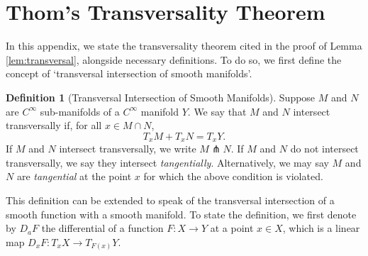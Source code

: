 \documentclass[11pt]{article}
\newcommand{\1}{\mathbf{1}}
\theoremstyle{definition}
\newtheorem{defn}{Definition}%
\theoremstyle{remark}
\begin{document}
\section{Thom's Transversality Theorem}\label{app:transversal}

In this appendix, we state the transversality theorem cited in the proof of Lemma \ref{lem:transversal}, alongside necessary definitions. To do so, we first define the concept of `transversal intersection of smooth manifolds'.

\begin{mdframed}
\begin{defn}[Transversal Intersection of Smooth Manifolds]\label{def:tang_travs}
    Suppose $M$ and $N$ are  $C^\infty$ sub-manifolds of a $C^\infty$ manifold $Y$. We say that $M$ and $N$ intersect transversally if, for all $x \in M \cap N$,
\begin{equation}\nonumber
T_x M+T_x N=T_x Y.
\end{equation}
If $M$ and $N$ intersect transversally, we write $M \pitchfork N$. If $M$ and $N$ do not intersect transversally, we say they intersect \textit{tangentially}. Alternatively, we may say $M$ and $N$ are \textit{tangential} at the point $x$ for which the above condition is violated.
\end{defn} 
\end{mdframed}
This definition can be extended to speak of the transversal intersection of a smooth function with a smooth manifold. To state the definition, we first denote by $D_a F$ the differential of a function $F:X\rightarrow Y$ at a point $x \in X$, which is a linear map $D_x F : T_x X \to T_{F(x)} Y$.
\end{document}
